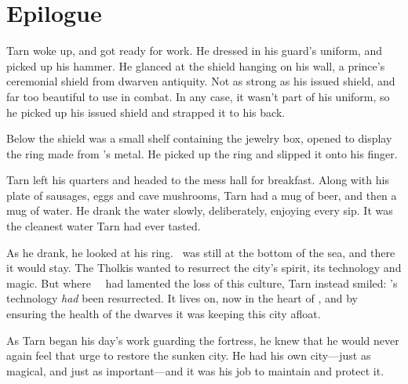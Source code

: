 \chapter*{Epilogue}

Tarn woke up, and got ready for work.  He dressed in his guard's uniform, and picked up his hammer.  He glanced at the shield hanging on his wall, a prince's ceremonial shield from dwarven antiquity.  Not as strong as his issued shield, and far too beautiful to use in combat.  In any case, it wasn't part of his uniform, so he picked up his issued shield and strapped it to his back.

Below the shield was a small shelf containing the jewelry box, opened to display the ring made from \kildir's metal.  He picked up the ring and slipped it onto his finger.

Tarn left his quarters and headed to the mess hall for breakfast.  Along with his plate of sausages, eggs and cave mushrooms, Tarn had a mug of beer, and then a mug of water.  He drank the water slowly, deliberately, enjoying every sip.  It was the cleanest water Tarn had ever tasted.

As he drank, he looked at his ring.  \valdunmir\ was still at the bottom of the sea, and there it would stay.  The Tholkis wanted to resurrect the city's spirit, its technology and magic.  But where \mothzam\ \driktur\ had lamented the loss of this culture, Tarn instead smiled: \valdunmir's technology \emph{had} been resurrected.  It lives on, now in the heart of \korbarthrond, and by ensuring the health of the dwarves it was keeping this city afloat.

As Tarn began his day's work guarding the fortress, he knew that he would never again feel that urge to restore the sunken city.  He had his own city---just as magical, and just as important---and it was his job to maintain and protect it.